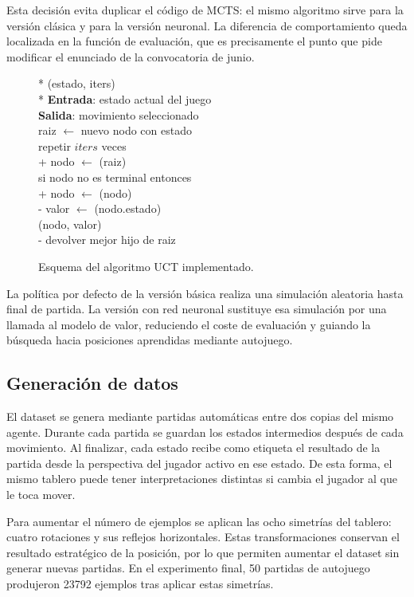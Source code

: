 \documentclass[conference,a4paper]{IEEEtran}
\begin{document}
Esta decisión evita duplicar el código de MCTS: el mismo algoritmo sirve para la
versión clásica y para la versión neuronal. La diferencia de comportamiento
queda localizada en la función de evaluación, que es precisamente el punto que
pide modificar el enunciado de la convocatoria de junio.

\begin{figure}[t]
\begin{pseudo}*
(estado, iters) \\*
\textbf{Entrada}: estado actual del juego \\
\textbf{Salida}: movimiento seleccionado \\
raiz \(\leftarrow\) nuevo nodo con estado \\
repetir \(iters\) veces \\+
  nodo \(\leftarrow\) (raiz) \\
  si nodo no es terminal entonces \\+
    nodo \(\leftarrow\) (nodo) \\-
  valor \(\leftarrow\) (nodo.estado) \\
  (nodo, valor) \\-
devolver mejor hijo de raiz
\end{pseudo}
\caption{Esquema del algoritmo UCT implementado.}
\label{pcd:uct}
\end{figure}

La política por defecto de la versión básica realiza una simulación aleatoria
hasta final de partida. La versión con red neuronal sustituye esa simulación por
una llamada al modelo de valor, reduciendo el coste de evaluación y guiando la
búsqueda hacia posiciones aprendidas mediante autojuego.

\subsection{Generación de datos}

El dataset se genera mediante partidas automáticas entre dos copias del mismo
agente. Durante cada partida se guardan los estados intermedios después de cada
movimiento. Al finalizar, cada estado recibe como etiqueta el resultado de la
partida desde la perspectiva del jugador activo en ese estado. De esta forma, el
mismo tablero puede tener interpretaciones distintas si cambia el jugador al que
le toca mover.

Para aumentar el número de ejemplos se aplican las ocho simetrías del tablero:
cuatro rotaciones y sus reflejos horizontales. Estas transformaciones conservan
el resultado estratégico de la posición, por lo que permiten aumentar el dataset
sin generar nuevas partidas. En el experimento final, 50 partidas de autojuego
produjeron 23792 ejemplos tras aplicar estas simetrías.
\end{document}
